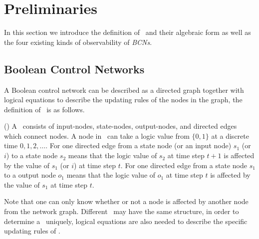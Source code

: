 \section{Preliminaries} 
\label{sec:pre}
In this section we introduce the definition of \BCNs\ and their algebraic form as well as the four existing kinds of observability of {\em BCNs}.



\subsection{Boolean Control Networks}

A Boolean control network can be described as a directed graph together with logical equations to describe the updating rules of the nodes in the graph, the definition of \BCN\ is as follows. 

\begin{definition}
(\cite{Ideker2001A}) A \BCN\ consists of input-nodes, state-nodes, output-nodes, and directed edges which connect nodes. A node in \BCN\ can take a logic value from $\{0,1\}$ at a discrete time $0, 1, 2,\ldots$. For one directed edge from a state node (or an input node) $s_1$ (or $i$) to a state node $s_2$ means that the logic value of $s_2$ at time step $t+1$ is affected by the value of $s_1$ (or $i$)  at time step $t$. For one directed edge from a state node $s_1$ to a output node $o_1$ means that the logic value of $o_1$ at time step $t$ is affected by the value of $s_1$  at time step $t$. 
\end{definition}


Note that one can only know whether or not a node is affected by another node from the network graph. Different \BCNs\ may have the same structure, in order to determine a \BCN\ uniquely, logical equations are also needed to describe the specific updating rules of \BCNs.

